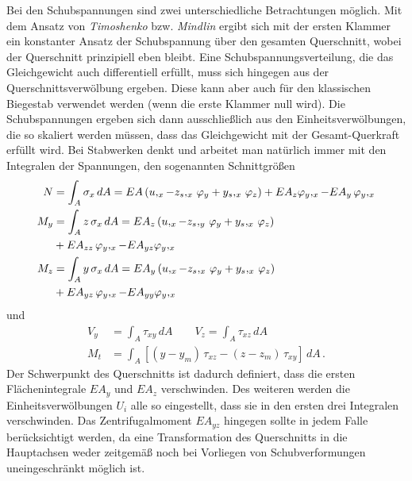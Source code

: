 Bei den Schubspannungen sind zwei unterschiedliche Betrachtungen m\"{o}g\-lich. Mit dem Ansatz von
{\em Timoshenko\/} bzw. {\em Mindlin\/} ergibt sich mit der ersten Klammer ein konstanter Ansatz der Schubspannung \"{u}ber den gesamten Querschnitt, wobei der Querschnitt prinzipiell eben bleibt. Eine Schubspannungsverteilung, die das Gleichgewicht auch differentiell erf\"{u}llt, muss sich hingegen aus der Querschnittsverw\"{o}lbung ergeben. Diese kann aber auch f\"{u}r den klassischen Biegestab verwendet werden (wenn die erste Klammer null wird). Die Schubspannungen ergeben sich dann ausschlie{\ss}lich aus den Einheitsverw\"{o}lbungen, die so skaliert werden m\"{u}ssen, dass das Gleichgewicht mit der Gesamt-Querkraft erf\"{u}llt wird. Bei Stabwerken denkt und arbeitet man nat\"{u}rlich immer mit den Integralen der Spannungen, den sogenannten Schnittgr\"{o}{\ss}en
\begin{align}
N &= \int_A \sigma_x\,dA = EA\,(u,_x - z_s,_x\,\varphi_y +
y_s,_x\,\varphi_z) + EA_z \varphi_y,_x - EA_y\,\varphi_y,_x \\
M_y &= \int_A z\,\sigma_x\,dA = EA_z\,(u,_x - z_s,_y\,\varphi_y + y_s,_x\,\varphi_z)\nonumber \\
 & +
EA_{zz}\,\varphi_y,_x - EA_{yz} \varphi_y,_x \\
M_z &= \int_A y\,\sigma_x\,dA = EA_y\,(u,_x - z_s,_x\,\varphi_y + y_s,_x\,\varphi_z) \nonumber \\
& +
EA_{yz}\,\varphi_y,_x - EA_{yy} \varphi_y,_x
\end{align}
und
\begin{align}
V_y &= \int_A \tau_{xy}\,dA  \qquad V_z = \int_A \tau_{xz}\,dA \\
M_t &= \int_A [(y - y_m)\,\tau_{xz} - (z - z_m)\,\tau_{xy}]\,dA\,.
\end{align}
Der Schwerpunkt des Querschnitts ist dadurch definiert, dass die ersten Fl\"{a}chenintegrale $EA_y$ und $EA_z$ verschwinden. Des weiteren werden die Einheitsverw\"{o}lbungen $U_i$ alle so eingestellt, dass sie in den ersten drei Integralen verschwinden. Das Zentrifugalmoment $EA_{yz}$ hingegen sollte in jedem Falle ber\"{u}cksichtigt werden, da eine Transformation des Querschnitts in die Hauptachsen weder zeitgem\"{a}{\ss} noch bei Vorliegen von Schubverformungen uneingeschr\"{a}nkt m\"{o}glich ist.

